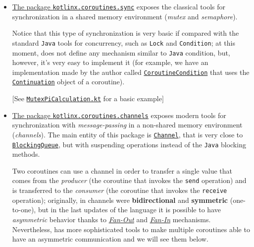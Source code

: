 \begin{itemize}
	\item \underline{The package \href{https://kotlinlang.org/api/kotlinx.coroutines/kotlinx-coroutines-core/kotlinx.coroutines.sync/}{\texttt{kotlinx.coroutines.sync}}} exposes the classical tools for synchronization in a shared memory environment (\textit{mutex} and \textit{semaphore}).
	
	Notice that this type of synchronization is very basic if compared with the standard \texttt{Java} tools for concurrency, such as \texttt{Lock} and \texttt{Condition}; at this moment, \Kotlin does not define any mechanism similar to \texttt{Java} condition, but, however, it's very easy to implement it (for example, we have an implementation made by the author called \href{https://github.com/LM-96/KBomber/blob/main/kbomberx-concurrency/src/main/kotlin/kbomberx/concurrency/sync/CoroutineCondition.kt}{\texttt{CoroutineCondition}} that uses the \href{https://kotlinlang.org/api/latest/jvm/stdlib/kotlin.coroutines/-continuation/}{\texttt{Continuation}} object of a coroutine).
	
	$\big[$See \href{https://github.com/LM-96/Activity-Project-Operating-Systems-M-/blob/main/code/kotlin/unibo.apos.examples/src/main/kotlin/unibo/apos/examples/MutexPiCalculation.kt}{\texttt{MutexPiCalculation.kt}} for a basic example$\big]$
	
	\item \underline{The package \href{https://kotlinlang.org/api/kotlinx.coroutines/kotlinx-coroutines-core/kotlinx.coroutines.channels/}{\texttt{kotlinx.coroutines.channels}}} exposes modern tools for synchronization with \textit{message-passing} in a non-shared memory environment (\textit{channels}).
	The main entity of this package is \href{https://kotlinlang.org/docs/channels.html}{\texttt{Channel}}, that is very close to \href{https://docs.oracle.com/en/java/javase/18/docs/api/java.base/java/util/concurrent/BlockingQueue.html}{\texttt{BlockingQueue}}, but with suspending operations instead of the \texttt{Java} blocking methods.
	
	Two coroutines can use a channel in order to transfer a single value that comes from the \textit{producer} (the coroutine that invokes the \texttt{send} operation) and is transferred to the \textit{consumer} (the coroutine that invokes the \texttt{receive} operation); originally, in \Kotlin channels were \textbf{bidirectional} and \textbf{symmetric} (one-to-one), but in the last updates of the language it is possible to have \textit{asymmetric} behavior thanks to \href{https://kotlinlang.org/docs/channels.html#fan-out}{\textit{Fan-Out}} and \href{https://kotlinlang.org/docs/channels.html#fan-in}{\textit{Fan-In}} mechanisms.
	Nevertheless, \Kotlin has more sophisticated tools to make multiple coroutines able to have an asymmetric communication and we will see them below. 
	

\end{itemize}
